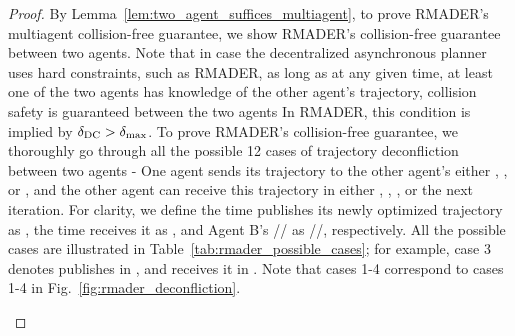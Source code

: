 \begin{proof}
By Lemma~\ref{lem:two_agent_suffices_multiagent}, to prove RMADER's multiagent collision-free guarantee, we show RMADER's collision-free guarantee between two agents.
Note that in case the decentralized asynchronous planner uses hard constraints, such as RMADER, as long as at any given time, at least one of the two agents has knowledge of the other agent's trajectory, collision safety is guaranteed between the two agents \textemdash In RMADER, this condition is implied by $\delta_\text{DC}{}>\delta_\text{max}{}$. 
To prove RMADER's collision-free guarantee, we thoroughly go through all the possible 12 cases of trajectory deconfliction between two agents - One agent sends its trajectory to the other agent's either \OStep{}, \CStep{}, or \DCStep{}, and the other agent can receive this trajectory in either \OStep{}, \CStep{}, \DCStep{}, or the next iteration. 
For clarity, we define the time \AgentA{} publishes its newly optimized trajectory as \tApub, the time \AgentB{} receives it as \tBrec, and Agent B's \OptimizationStep/\CheckStep/\DelayCheckStep{} as \OStepB/\CStepB/\DCStepB, respectively. All the possible cases are illustrated in Table~\ref{tab:rmader_possible_cases}; for example, case 3 denotes \AgentA{} publishes in \OStepB{}, and \AgentB{} receives it in \DCStepB{}. Note that cases 1-4 correspond to cases 1-4 in Fig.~\ref{fig:rmader_deconfliction}.
\begin{table}[H]
\caption{\centering RMADER Trajectory Deconfliction Cases}
\label{tab:rmader_possible_cases}
\begin{centering}
\renewcommand{\arraystretch}{1.2}
\par\end{centering}
\end{table}


\end{proof}
